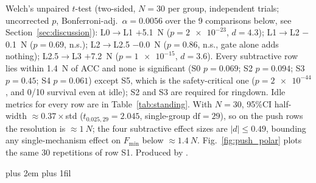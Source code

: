 \documentclass[a4paper,fleqn]{cas-dc}
\newcommand{\tabnote}{\par\leftskip=0pt\rightskip=0pt plus 2em%
  \parfillskip=0pt plus 1fil\relax}
\begin{document}
\begin{table}[pos=!tbp]
Welch's unpaired $t$-test (two-sided, $N{=}30$ per group, independent trials; uncorrected $p$, Bonferroni-adj.\ $\alpha{=}0.0056$ over the \num{9} comparisons below, see Section~\ref{sec:discussion}): L0$\rightarrow$L1 $+$\SI{5.1}{N} ($p{=}\num{2e-23}$, $d{=}4.3$); L1$\rightarrow$L2 $-$\SI{0.1}{N} ($p{=}0.69$, n.s.); L2$\rightarrow$L2.5 $-$\SI{0.0}{N} ($p{=}0.86$, n.s., gate alone adds nothing); L2.5$\rightarrow$L3 $+$\SI{7.2}{N} ($p{=}\num{1e-15}$, $d{=}3.6$). Every subtractive row lies within \SI{1.4}{N} of ACC and none is significant (S0 $p{=}0.069$; S2 $p{=}0.094$; S3 $p{=}0.45$; S4 $p{=}0.061$) except S5, which is the safety-critical one ($p{=}\num{2e-44}$, and \num{0}/\num{10} survival even at idle); S2 and S3 are required for ringdown. Idle metrics for every row are in Table~\ref{tab:standing}. With $N{=}30$, 95\%CI half-width ${\approx}0.37{\times}$std ($t_{0.025,29}{=}2.045$, single-group $\text{df}{=}29$), so on the push rows the resolution is ${\approx}\SI{1}{N}$; the four subtractive effect sizes are $|d|{\le}0.49$, bounding any single-mechanism effect on $F_{\min}$ below ${\approx}\SI{1.4}{N}$. Fig.~\ref{fig:push_polar} plots the same \num{30} repetitions of row S1. Produced by .\tabnote\noindent
\end{table}
\end{document}
